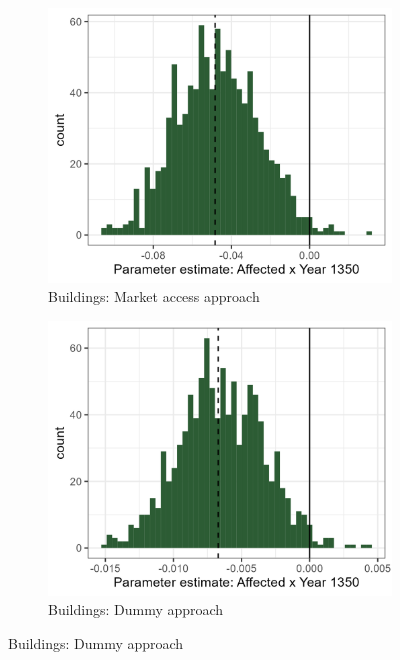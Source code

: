 \begin{figure}
\begin{subfigure}[b]{0.45\textwidth}
    \end{subfigure}
    \vspace{0.45cm}
    \begin{subfigure}[b]{0.45\textwidth}
        \centering
        \caption{Buildings: Market access approach} \label{fig:distri_c_match_norm}
        \includegraphics[width=\textwidth]{Plots/Regression_plots/arch_MA_buildings_matched_boot_norm.png}
    \end{subfigure}
    \hfill
    \begin{subfigure}[b]{0.45\textwidth}
        \centering
        \caption{Buildings: Dummy approach} \label{fig:distri_d_match_norm}
        \includegraphics[width=\textwidth]{Plots/Regression_plots/arch_dummy_buildings_matched_boot_norm.png}
    \end{subfigure}
    \label{fig:arch_reg_boot2}
\end{figure}




